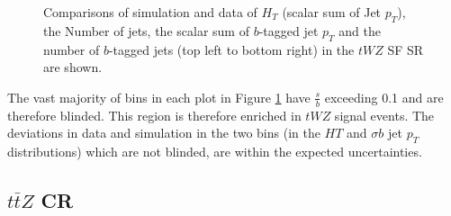 \begin{figure}[htbp]
\caption{Comparisons of simulation and data of $H_{T}$ (scalar sum of Jet $p_{T}$), the Number of jets, the scalar sum of $b$-tagged jet $p_{T}$ and the number of $b$-tagged jets (top left to bottom right) in the $tWZ$ SF SR are shown.}\label{fig:4lep-SF-SR-jets-bjet} 
\end{figure}The vast majority of bins in each plot in Figure \ref{fig:4lep-SF-SR-jets-bjet} have $\frac{s}{b}$ exceeding 0.1 and are therefore blinded. This region is therefore enriched in $tWZ$ signal events. The deviations in data and simulation in the two bins (in the $HT$ and $\sigma b$ jet $p_{T}$ distributions) which are not blinded, are within the expected uncertainties.


\subsection{$t\bar{t}Z$ CR}
\label{sec:controlplotstetralepton-ttZ-CR}


